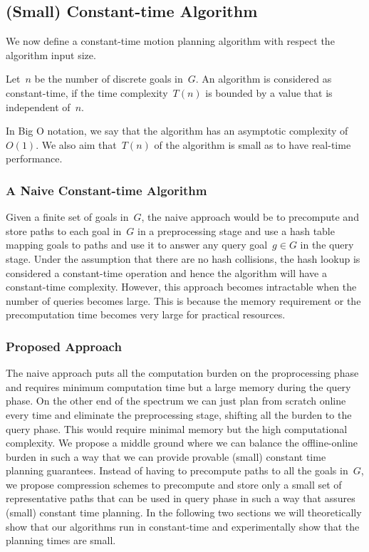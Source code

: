 \documentclass[a4paper,10pt]{article}
\begin{document}
\subsection{(Small) Constant-time Algorithm}
We now define a constant-time motion planning algorithm with respect the algorithm input size.
\begin{definition}
	Let~$n$ be the number of discrete goals in~$G$. An algorithm is considered as constant-time, if the time complexity~$T(n)$ is bounded by a value that is independent of~$n$.
\end{definition}
In Big O notation, we say that the algorithm has an asymptotic complexity of~$O(1)$. We also aim that~$T(n)$ of the algorithm is small as to have real-time performance.

\subsubsection{A Naive Constant-time Algorithm}
Given a finite set of goals in~$G$, the naive approach would be to precompute and store paths to each goal in~$G$ in a preprocessing stage and use a hash table mapping goals to paths and use it to answer any query goal~$g \in G$ in the query stage. Under the assumption that there are no hash collisions, the hash lookup is considered a constant-time operation and hence the algorithm will have a constant-time complexity. However, this approach becomes intractable when the number of queries becomes large. This is because the memory requirement or the precomputation time becomes very large for practical resources.

\subsubsection{Proposed Approach}
The naive approach puts all the computation burden on the proprocessing phase and requires minimum computation time but a large memory during the query phase. On the other end of the spectrum we can just plan from scratch online every time and eliminate the preprocessing stage, shifting all the burden to the query phase. This would require minimal memory but the high computational complexity. We propose a middle ground where we can balance the offline-online burden in such a way that we can provide provable (small) constant time planning guarantees. Instead of having to precompute paths to all the goals in~$G$, we propose compression schemes to precompute and store only a small set of representative paths that can be used in query phase in such a way that assures (small) constant time planning. In the following two sections we will theoretically show that our algorithms run in constant-time and experimentally show that the planning times are small.
\end{document}

